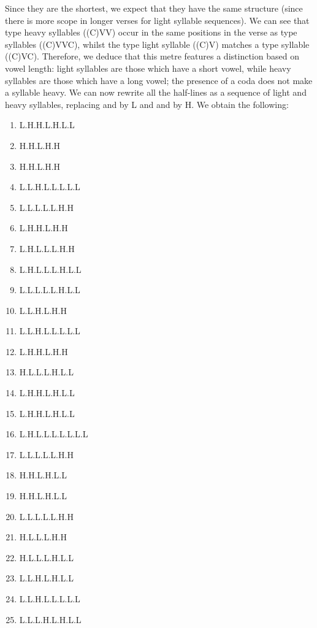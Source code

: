\begin{refsection}
\begin{mysolution}
\begin{center}
 \quad\quad\quad\quad\quad {}
\end{center}

Since they are the shortest, we expect that they have the same structure (since there is more scope in longer verses for light syllable sequences). We can see that type  heavy syllables  ((C)VV) occur in the same positions in the verse as type  syllables ((C)VVC), whilst the type  light syllable ((C)V) matches a type  syllable ((C)VC). Therefore, we deduce that this metre features a distinction based on vowel length: light syllables are those which have a short vowel, while heavy syllables are those which have a long vowel; the presence of a coda does not make a syllable heavy. We can now rewrite all the half-lines as a sequence of light and heavy syllables, replacing  and  by L and  and  by H. We obtain the following:

\begin{multicols}{3}
\begin{enumerate}[noitemsep]
    \item L.H.H.L.H.L.L
    \item H.H.L.H.H
    \item H.H.L.H.H
    \item L.L.H.L.L.L.L.L
    \item L.L.L.L.L.H.H
    \item L.H.H.L.H.H
    \item L.H.L.L.L.H.H
    \item L.H.L.L.L.H.L.L
    \item L.L.L.L.L.H.L.L
    \item L.L.H.L.H.H
    \item L.L.H.L.L.L.L.L
    \item L.H.H.L.H.H
    \item H.L.L.L.H.L.L
    \item L.H.H.L.H.L.L
    \item L.H.H.L.H.L.L
    \item L.H.L.L.L.L.L.L.L
    \item L.L.L.L.L.H.H
    \item H.H.L.H.L.L
    \item H.H.L.H.L.L
    \item L.L.L.L.L.H.H
    \item H.L.L.L.H.H
    \item H.L.L.L.H.L.L
    \item L.L.H.L.H.L.L
    \item L.L.H.L.L.L.L.L
    \item L.L.L.H.L.H.L.L
    \blankitem
\end{enumerate}
\end{multicols}


\end{mysolution}
\end{refsection}
